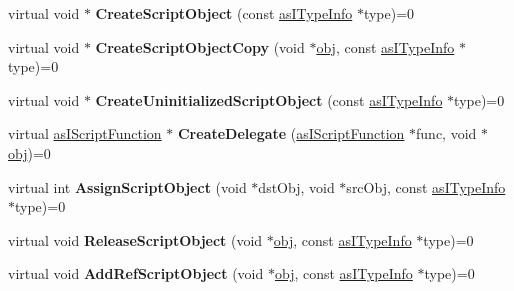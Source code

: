 \begin{DoxyCompactItemize}
\mbox{\label{classas_i_script_engine_a3101479b4340bc16bb9acb8e8d554266}} 
virtual void $\ast$ {\bfseries Create\+Script\+Object} (const \hyperlink{classas_i_type_info}{as\+I\+Type\+Info} $\ast$type)=0
\item 
\mbox{\label{classas_i_script_engine_ab2b1543ea6d24b912aebeb77e6764269}} 
virtual void $\ast$ {\bfseries Create\+Script\+Object\+Copy} (void $\ast$\hyperlink{structobj}{obj}, const \hyperlink{classas_i_type_info}{as\+I\+Type\+Info} $\ast$type)=0
\item 
\mbox{\label{classas_i_script_engine_a9de3c5e4465f699ad698740d6037e1a6}} 
virtual void $\ast$ {\bfseries Create\+Uninitialized\+Script\+Object} (const \hyperlink{classas_i_type_info}{as\+I\+Type\+Info} $\ast$type)=0
\item 
\mbox{\label{classas_i_script_engine_ab4a4cea1cfeea361b8a44d80f3d928e3}} 
virtual \hyperlink{classas_i_script_function}{as\+I\+Script\+Function} $\ast$ {\bfseries Create\+Delegate} (\hyperlink{classas_i_script_function}{as\+I\+Script\+Function} $\ast$func, void $\ast$\hyperlink{structobj}{obj})=0
\item 
\mbox{\label{classas_i_script_engine_a9180da5fd475f52916be6b39e522fabb}} 
virtual int {\bfseries Assign\+Script\+Object} (void $\ast$dst\+Obj, void $\ast$src\+Obj, const \hyperlink{classas_i_type_info}{as\+I\+Type\+Info} $\ast$type)=0
\item 
\mbox{\label{classas_i_script_engine_a82873d3769ded547894a7c3d52c220fd}} 
virtual void {\bfseries Release\+Script\+Object} (void $\ast$\hyperlink{structobj}{obj}, const \hyperlink{classas_i_type_info}{as\+I\+Type\+Info} $\ast$type)=0
\item 
\mbox{\label{classas_i_script_engine_ade1d309876c876c733d437a53e708c28}} 
virtual void {\bfseries Add\+Ref\+Script\+Object} (void $\ast$\hyperlink{structobj}{obj}, const \hyperlink{classas_i_type_info}{as\+I\+Type\+Info} $\ast$type)=0
\item 
\mbox{\label{classas_i_script_engine_a32c9d9aac77a67eeb046fc67d7473fa2}} 

\end{DoxyCompactItemize}
